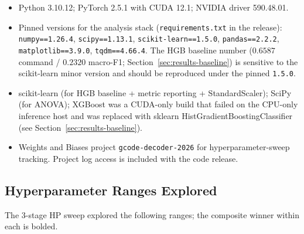 \begin{itemize}
\item Python 3.10.12; PyTorch 2.5.1 with CUDA 12.1; NVIDIA driver 590.48.01.
\item Pinned versions for the analysis stack (\texttt{requirements.txt} in
the release): \texttt{numpy==1.26.4}, \texttt{scipy==1.13.1},
\texttt{scikit-learn==1.5.0}, \texttt{pandas==2.2.2},
\texttt{matplotlib==3.9.0}, \texttt{tqdm==4.66.4}. The HGB baseline number
($0.6587$ command / $0.2320$ macro-F1; Section~\ref{sec:results-baseline})
is sensitive to the scikit-learn minor version and should be reproduced
under the pinned \texttt{1.5.0}.
\item scikit-learn (for HGB baseline + metric reporting + StandardScaler);
SciPy (for ANOVA); XGBoost was a CUDA-only build that failed on the
CPU-only inference host and was replaced with sklearn HistGradientBoostingClassifier
(see Section~\ref{sec:results-baseline}).
\item Weights and Biases project \texttt{gcode-decoder-2026} for
hyperparameter-sweep tracking. Project log access is included with the
code release.
\end{itemize}

\subsection{Hyperparameter Ranges Explored}
\label{app:repl-hp-ranges}

The 3-stage HP sweep explored the following ranges; the composite winner
within each is bolded.

